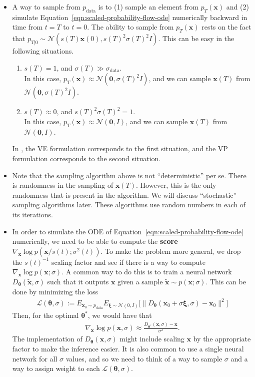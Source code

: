 \documentclass[10pt]{article}
\newcommand{\ve}[1]{\mathbf{#1}}
\newcommand{\ves}[1]{\boldsymbol{#1}}
\newcommand{\mcal}[1]{\mathcal{#1}}
\newcommand{\data}{\mathrm{data}}
\begin{document}
\begin{itemize}
  \item A way to sample from $p_{\data}$ is to (1) sample an element from $p_T(\ve{x})$ and (2) simulate Equation~\eqref{eqn:scaled-probability-flow-ode} numerically backward in time from $t = T$ to $t = 0$. The ability to sample from $p_T(\ve{x})$ rests on the fact that $p_{T|0} \sim \mcal{N}(s(T)\ve{x}(0), s(T)^2 \sigma(T)^2I)$. This can be easy in the following situations.
  \begin{enumerate}
    \item $s(T) = 1$, and $\sigma(T) \gg \sigma_{\data}$.\\ In this case, $p_T(\ve{x}) \approx \mcal{N}(\ve{0}, \sigma(T)^2I)$, and we can sample $\ve{x}(T)$ from $\mcal{N}(\ve{0}, \sigma(T)^2I)$.
    \item $s(T) \approx 0$, and $s(T)^2 \sigma(T)^2 = 1$.\\ In this case, $p_T(\ve{x}) \approx \mcal{N}(\ve{0}, I)$, and we can sample $\ve{x}(T)$ from $\mcal{N}(\ve{0}, I)$.
  \end{enumerate}
  In \cite{Song:2021}, the VE formulation corresponds to the first situation, and the VP formulation corresponds to the second situation. 

  \item Note that the sampling algorithm above is not ``deterministic'' per se. There is randomness in the sampling of $\ve{x}(T)$. However, this is the only randomness that is present in the algorithm. We will discuss ``stochastic'' sampling algorithms later. These algorithms use random numbers in each of its iterations.
  
  \item In order to simulate the ODE of Equation~\eqref{eqn:scaled-probability-flow-ode} numerically, we need to be able to compute the {\bf score} $\nabla_{\ve{x}} \log p(\ve{x}/s(t); \sigma^2(t))$. To make the problem more general, we drop the $s(t)^{-1}$ scaling factor and see if there is a way to compute $\nabla_{\ve{x}} \log p(\ve{x}; \sigma)$. A common way to do this is to train a neural network $D_{\ves{\theta}}(\widetilde{\ve{x}}, \sigma)$ such that it outputs $\ve{x}$ given a sample $\widetilde{\ve{x}} \sim p(\ve{x}; \sigma)$. This can be done by minimizing the loss
  \begin{align*}
    \mcal{L}(\ves{\theta}, \sigma) := E_{\ve{x}_0 \sim p_{\data}} E_{\ves{\xi} \sim \mcal{N}(0,I)} \Big[ \big\| D_{\ves{\theta}}(\ve{x}_0 + \sigma \ves{\xi}, \sigma) - \ve{x}_0 \big\|^2 \Big]
  \end{align*}
  Then, for the optimal $\ves{\theta}^*$, we would have that
  \begin{align*}
    \nabla_{\ve{x}} \log p(\ve{x}, \sigma) \approx \frac{D_{\ves{\theta}^*}(\ve{x}, \sigma) - \ve{x}}{\sigma^2}.
  \end{align*}
  The implementation of $D_{\ves{\theta}}(\ve{x}, \sigma)$ might include scaling $\ve{x}$ by the appropriate factor to make the inference easier. It is also common to use a single neural network for all $\sigma$ values, and so we need to think of a way to sample $\sigma$ and a way to assign weight to each $\mcal{L}(\ves{\theta}, \sigma)$. 
  

\end{itemize}
\end{document}
